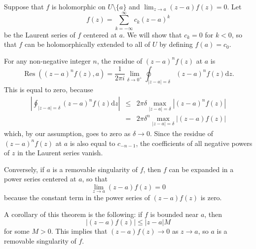 \documentclass[12pt]{article}
\begin{document}
Suppose that $f$ is holomorphic on $U\setminus\{a\}$ and $\lim_{z\to a}(z-a)f(z)=0$.  Let
$$
f(z)=\sum_{k=-\infty}^{\infty}c_k (z-a)^k
$$
be the Laurent series of $f$ centered at $a$.  We will show that $c_k=0$ for $k<0$, so that $f$ can be holomorphically extended to all of $U$ by defining $f(a)=c_0$.

For any non-negative integer $n$, the residue of $(z-a)^n f(z)$ at $a$ is
$$
\operatorname{Res}((z-a)^n f(z),a)=\frac{1}{2\pi i}
\lim_{\delta\to 0^+}\oint_{|z-a|=\delta}(z-a)^n f(z)\mathrm{d}z.
$$
This is equal to zero, because
\begin{eqnarray*}
\left|\oint_{|z-a|=\delta}(z-a)^n f(z)\mathrm{d}z\right|
&\le&2\pi\delta\max_{|z-a|=\delta}|(z-a)^n f(z)|\\
&=&2\pi\delta^n\max_{|z-a|=\delta}|(z-a)f(z)|
\end{eqnarray*}
which, by our assumption, goes to zero as $\delta\to 0$.  Since the residue of $(z-a)^n f(z)$ at $a$ is also equal to $c_{-n-1}$, the coefficients of all negative powers of $z$ in the Laurent series vanish.

Conversely, if $a$ is a removable singularity of $f$, then $f$ can be expanded in a power series centered at $a$, so that
$$
\lim_{z\to a}(z-a)f(z)=0
$$
because the constant term in the power series of $(z-a)f(z)$ is zero.

A corollary of this theorem is the following: if $f$ is bounded near $a$, then
$$
|(z-a)f(z)|\le|z-a|M
$$
for some $M>0$.  This implies that $(z-a)f(z)\to 0$ as $z\to a$, so $a$ is a removable singularity of $f$.
\end{document}
